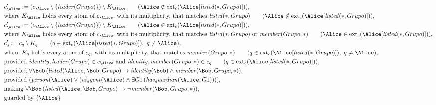 \begin{align*}
&
c'_
{
\Alice
}
 := 
(c_
{
\Alice
}
 \setminus 
\{
\mathit{
leader
}
(
Grupo
)
\}
) \setminus K_
{
\Alice
}
 \qquad (
\Alice
 \notin 
\mathrm{ext}_c(
\Alice
[
\mathit{
listed
}
(
\ast
,
Grupo
)
]
)
)
,\\
&
\text{where } K_
{
\Alice
}
 \text{ holds every atom of } c_
{
\Alice
}
 \text{, with its multiplicity, that matches } 
\mathit{
listed
}
(
\ast
,
Grupo
)
 \qquad (
\Alice
 \notin 
\mathrm{ext}_c(
\Alice
[
\mathit{
listed
}
(
\ast
,
Grupo
)
]
)
)
,\\
&
c'_
{
\Alice
}
 := 
(c_
{
\Alice
}
 \setminus 
\{
\mathit{
leader
}
(
Grupo
)
\}
) \setminus K_
{
\Alice
}
 \qquad (
\Alice
 \in 
\mathrm{ext}_c(
\Alice
[
\mathit{
listed
}
(
\ast
,
Grupo
)
]
)
)
,\\
&
\text{where } K_
{
\Alice
}
 \text{ holds every atom of } c_
{
\Alice
}
 \text{, with its multiplicity, that matches } 
\mathit{
listed
}
(
\ast
,
Grupo
)
 \text{ or } 
\mathit{
member
}
(
Grupo
,
\ast
)
 \qquad (
\Alice
 \in 
\mathrm{ext}_c(
\Alice
[
\mathit{
listed
}
(
\ast
,
Grupo
)
]
)
)
,\\
&
c'_
q
 := 
c_
q
 \setminus K_
q
 \qquad (
q
 \in 
\mathrm{ext}_c(
\Alice
[
\mathit{
listed
}
(
\ast
,
Grupo
)
]
)
,\ 
q \neq 
\Alice
)
,\\
&
\text{where } K_
q
 \text{ holds every atom of } c_
q
 \text{, with its multiplicity, that matches } 
\mathit{
member
}
(
Grupo
,
\ast
)
 \qquad (
q
 \in 
\mathrm{ext}_c(
\Alice
[
\mathit{
listed
}
(
\ast
,
Grupo
)
]
)
,\ 
q \neq 
\Alice
)
,\\
&
\text{provided } 
\mathit{
identity
}
,
\mathit{
leader
}
(
Grupo
)
 \in c_
{
\Alice
}
 \text{ and } 
\mathit{
identity
}
,
\mathit{
member
}
(
Grupo
,
\ast
)
 \in c_
q
 \qquad (
q \in 
\mathrm{ext}_c(
\Alice
[
\mathit{
listed
}
(
\ast
,
Grupo
)
]
)
)
,\\
&
\text{provided } 
\forall 
\Bob
\,(
\mathit{
listed
}
(
\Alice
,
\Bob
,
Grupo
)
\rightarrow
\mathit{
identity
}
(
\Bob
)
\land
\mathit{
member
}
(
\Bob
,
Grupo
,
\ast
)
)
,\\
&
\text{provided } 
(
\mathit{
person
}
(
\Alice
)
\lor
(
\mathit{
ai_agent
}
(
\Alice
)
\land
\exists 
G1
\,(
\mathit{
has_guardian
}
(
\Alice
,
G1
)
)
)
)
,\\
&
\text{making } 
\forall 
\Bob
\,(
\mathit{
listed
}
(
\Alice
,
\Bob
,
Grupo
)
\rightarrow
\neg 
\mathit{
member
}
(
\Bob
,
Grupo
,
\ast
)
)
,\\
&
\text{guarded by } \{
\Alice
\}
\end{align*}
